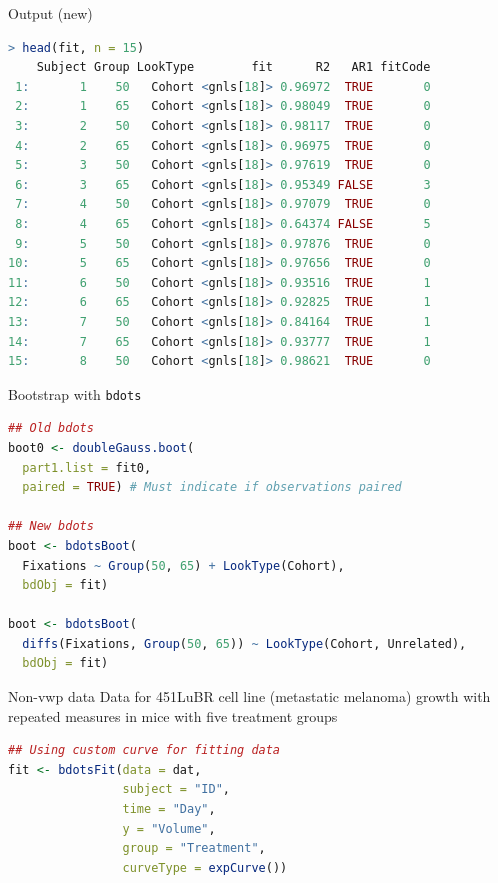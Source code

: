 \documentclass{beamer}
\begin{document}
\begin{frame}[fragile]{Output (new)}
\lstset{basicstyle=\footnotesize\ttfamily, style = rstyle}
\begin{lstlisting}[language=R, showstringspaces=false,deletekeywords={data,col,time,c,}]
> head(fit, n = 15)
    Subject Group LookType        fit      R2   AR1 fitCode
 1:       1    50   Cohort <gnls[18]> 0.96972  TRUE       0
 2:       1    65   Cohort <gnls[18]> 0.98049  TRUE       0
 3:       2    50   Cohort <gnls[18]> 0.98117  TRUE       0
 4:       2    65   Cohort <gnls[18]> 0.96975  TRUE       0
 5:       3    50   Cohort <gnls[18]> 0.97619  TRUE       0
 6:       3    65   Cohort <gnls[18]> 0.95349 FALSE       3
 7:       4    50   Cohort <gnls[18]> 0.97079  TRUE       0
 8:       4    65   Cohort <gnls[18]> 0.64374 FALSE       5
 9:       5    50   Cohort <gnls[18]> 0.97876  TRUE       0
10:       5    65   Cohort <gnls[18]> 0.97656  TRUE       0
11:       6    50   Cohort <gnls[18]> 0.93516  TRUE       1
12:       6    65   Cohort <gnls[18]> 0.92825  TRUE       1
13:       7    50   Cohort <gnls[18]> 0.84164  TRUE       1
14:       7    65   Cohort <gnls[18]> 0.93777  TRUE       1
15:       8    50   Cohort <gnls[18]> 0.98621  TRUE       0
\end{lstlisting}
\end{frame}

\begin{frame}[fragile]{Bootstrap with \texttt{bdots}}
\lstset{basicstyle=\footnotesize\ttfamily, style = rstyle}
\begin{lstlisting}[language=R, showstringspaces=false,deletekeywords={data,col,time,c,list}]
## Old bdots
boot0 <- doubleGauss.boot(
  part1.list = fit0, 
  paired = TRUE) # Must indicate if observations paired
  
## New bdots
boot <- bdotsBoot(
  Fixations ~ Group(50, 65) + LookType(Cohort), 
  bdObj = fit)
  
boot <- bdotsBoot(
  diffs(Fixations, Group(50, 65)) ~ LookType(Cohort, Unrelated), 
  bdObj = fit)
\end{lstlisting}
\end{frame}

\begin{frame}[fragile]{Non-vwp data}
Data for 451LuBR cell line (metastatic melanoma) growth with repeated measures in mice with five treatment groups \newline \\

\lstset{basicstyle=\footnotesize\ttfamily, style = rstyle}
\begin{lstlisting}[language=R, showstringspaces=false,deletekeywords={data,col,time,c,}]
## Using custom curve for fitting data
fit <- bdotsFit(data = dat, 
                subject = "ID", 
                time = "Day", 
                y = "Volume", 
                group = "Treatment", 
                curveType = expCurve())
\end{lstlisting}
\end{frame}
\end{document}
